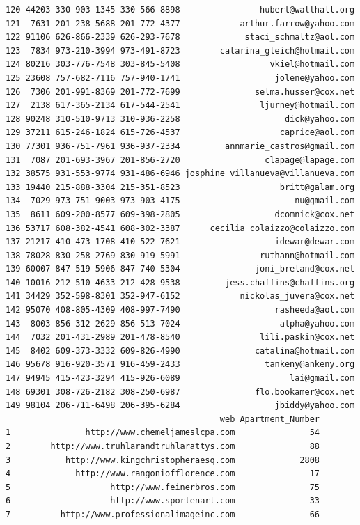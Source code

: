 \documentclass[
  12pt,
]{article}
\begin{document}
\begin{verbatim}
120 44203 330-903-1345 330-566-8898                hubert@walthall.org
121  7631 201-238-5688 201-772-4377            arthur.farrow@yahoo.com
122 91106 626-866-2339 626-293-7678             staci_schmaltz@aol.com
123  7834 973-210-3994 973-491-8723        catarina_gleich@hotmail.com
124 80216 303-776-7548 303-845-5408                  vkiel@hotmail.com
125 23608 757-682-7116 757-940-1741                   jolene@yahoo.com
126  7306 201-991-8369 201-772-7699               selma.husser@cox.net
127  2138 617-365-2134 617-544-2541                ljurney@hotmail.com
128 90248 310-510-9713 310-936-2258                     dick@yahoo.com
129 37211 615-246-1824 615-726-4537                    caprice@aol.com
130 77301 936-751-7961 936-937-2334         annmarie_castros@gmail.com
131  7087 201-693-3967 201-856-2720                 clapage@lapage.com
132 38575 931-553-9774 931-486-6946 josphine_villanueva@villanueva.com
133 19440 215-888-3304 215-351-8523                    britt@galam.org
134  7029 973-751-9003 973-903-4175                       nu@gmail.com
135  8611 609-200-8577 609-398-2805                   dcomnick@cox.net
136 53717 608-382-4541 608-302-3387      cecilia_colaizzo@colaizzo.com
137 21217 410-473-1708 410-522-7621                   idewar@dewar.com
138 78028 830-258-2769 830-919-5991                ruthann@hotmail.com
139 60007 847-519-5906 847-740-5304               joni_breland@cox.net
140 10016 212-510-4633 212-428-9538         jess.chaffins@chaffins.org
141 34429 352-598-8301 352-947-6152            nickolas_juvera@cox.net
142 95070 408-805-4309 408-997-7490                   rasheeda@aol.com
143  8003 856-312-2629 856-513-7024                    alpha@yahoo.com
144  7032 201-431-2989 201-478-8540                lili.paskin@cox.net
145  8402 609-373-3332 609-826-4990               catalina@hotmail.com
146 95678 916-920-3571 916-459-2433                 tankeny@ankeny.org
147 94945 415-423-3294 415-926-6089                      lai@gmail.com
148 69301 308-726-2182 308-250-6987               flo.bookamer@cox.net
149 98104 206-711-6498 206-395-6284                   jbiddy@yahoo.com
                                           web Apartment_Number
1               http://www.chemeljameslcpa.com               54
2        http://www.truhlarandtruhlarattys.com               88
3           http://www.kingchristopheraesq.com             2808
4             http://www.rangoniofflorence.com               17
5                    http://www.feinerbros.com               75
6                    http://www.sportenart.com               33
7          http://www.professionalimageinc.com               66

\end{verbatim}
\end{document}

